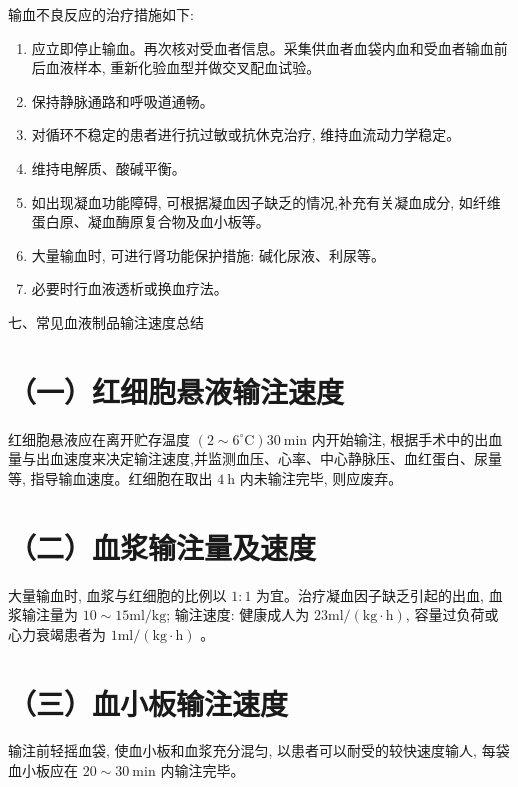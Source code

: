\documentclass[10pt]{article}
\begin{document}
输血不良反应的治疗措施如下:

\begin{enumerate}
  \item 应立即停止输血。再次核对受血者信息。采集供血者血袋内血和受血者输血前后血液样本, 重新化验血型并做交叉配血试验。

  \item 保持静脉通路和呼吸道通畅。

  \item 对循环不稳定的患者进行抗过敏或抗休克治疗, 维持血流动力学稳定。

  \item 维持电解质、酸碱平衡。

  \item 如出现凝血功能障碍, 可根据凝血因子缺乏的情况,补充有关凝血成分, 如纤维蛋白原、凝血酶原复合物及血小板等。

  \item 大量输血时, 可进行肾功能保护措施: 碱化尿液、利尿等。

  \item 必要时行血液透析或换血疗法。

\end{enumerate}

七、常见血液制品输注速度总结

\section*{（一）红细胞悬液输注速度}
红细胞悬液应在离开贮存温度 $\left(2 \sim 6^{\circ} \mathrm{C}\right) 30 \mathrm{~min}$ 内开始输注, 根据手术中的出血量与出血速度来决定输注速度,并监测血压、心率、中心静脉压、血红蛋白、尿量等, 指导输血速度。红细胞在取出 $4 \mathrm{~h}$ 内未输注完毕, 则应废弃。

\section*{（二）血浆输注量及速度}
大量输血时, 血浆与红细胞的比例以 $1: 1$ 为宜。治疗凝血因子缺乏引起的出血, 血浆输注量为 $10 \sim 15 \mathrm{ml} / \mathrm{kg}$; 输注速度: 健康成人为 $23 \mathrm{ml} /(\mathrm{kg} \cdot \mathrm{h})$, 容量过负荷或心力衰竭患者为 $1 \mathrm{ml} /(\mathrm{kg} \cdot \mathrm{h})$ 。

\section*{（三）血小板输注速度}
输注前轻摇血袋, 使血小板和血浆充分混匀, 以患者可以耐受的较快速度输人, 每袋血小板应在 $20 \sim 30 \mathrm{~min}$ 内输注完毕。
\end{document}
